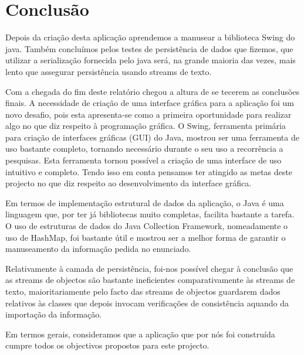 \documentclass[a5paper,twocolumn, 11pt]{article}
\begin{document}
\newpage
\twocolumn

\clearpage
\section{Conclusão}
Depois da criação desta aplicação aprendemos a manusear a biblioteca Swing do java.
Também concluímos pelos testes de persistência de dados que fizemos, que utilizar a serialização fornecida pelo java será, na grande maioria das vezes, mais lento que assegurar persistência usando streams de texto.


Com a chegada do fim deste relatório chegou a altura de se tecerem as conclusões finais. A necessidade de criação de uma interface gráfica para a aplicação foi um novo desafio, pois esta apresenta-se como a primeira oportunidade para realizar algo no que diz respeito à programação gráfica. O Swing, ferramenta primária para criação de interfaces gráficas (GUI) do Java, mostrou ser uma ferramenta de uso bastante completo, tornando necessário durante o seu uso a recorrência a pesquisas. Esta ferramenta tornou possível a criação de uma interface de uso intuitivo e completo. Tendo isso em conta pensamos ter atingido as metas deste projecto no que diz respeito ao desenvolvimento da interface gráfica.

Em termos de implementação estrutural de dados da aplicação, o Java é uma linguagem que, por ter já bibliotecas muito completas, facilita bastante a tarefa. O uso de estruturas de dados do Java Collection Framework, nomeadamente o uso de HashMap, foi bastante útil e mostrou ser a melhor forma de garantir o manuseamento da informação pedida no enunciado.

Relativamente à camada de persistência, foi-nos possível chegar à conclusão que as streams de objectos são bastante ineficientes comparativamente às streams de texto, maioritariamente pelo facto das streams de objectos guardarem dados relativos às classes que depois invocam verificações de consistência aquando da importação da informação.

Em termos gerais, consideramos que a aplicação que por nós foi construída cumpre todos os objectivos propostos para este projecto.


\clearpage
\onecolumn
\end{document}

